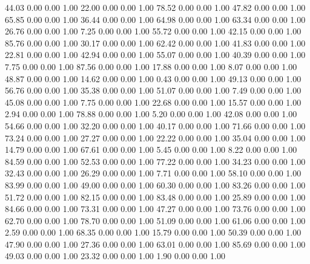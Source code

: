    44.03   0.00   0.00   1.00
   22.00   0.00   0.00   1.00
   78.52   0.00   0.00   1.00
   47.82   0.00   0.00   1.00
   65.85   0.00   0.00   1.00
   36.44   0.00   0.00   1.00
   64.98   0.00   0.00   1.00
   63.34   0.00   0.00   1.00
   26.76   0.00   0.00   1.00
    7.25   0.00   0.00   1.00
   55.72   0.00   0.00   1.00
   42.15   0.00   0.00   1.00
   85.76   0.00   0.00   1.00
   30.17   0.00   0.00   1.00
   62.42   0.00   0.00   1.00
   41.83   0.00   0.00   1.00
   22.81   0.00   0.00   1.00
   42.94   0.00   0.00   1.00
   55.07   0.00   0.00   1.00
   40.39   0.00   0.00   1.00
    7.75   0.00   0.00   1.00
   87.56   0.00   0.00   1.00
   17.88   0.00   0.00   1.00
    8.07   0.00   0.00   1.00
   48.87   0.00   0.00   1.00
   14.62   0.00   0.00   1.00
    0.43   0.00   0.00   1.00
   49.13   0.00   0.00   1.00
   56.76   0.00   0.00   1.00
   35.38   0.00   0.00   1.00
   51.07   0.00   0.00   1.00
    7.49   0.00   0.00   1.00
   45.08   0.00   0.00   1.00
    7.75   0.00   0.00   1.00
   22.68   0.00   0.00   1.00
   15.57   0.00   0.00   1.00
    2.94   0.00   0.00   1.00
   78.88   0.00   0.00   1.00
    5.20   0.00   0.00   1.00
   42.08   0.00   0.00   1.00
   54.66   0.00   0.00   1.00
   32.20   0.00   0.00   1.00
   40.17   0.00   0.00   1.00
   71.66   0.00   0.00   1.00
   73.24   0.00   0.00   1.00
   27.27   0.00   0.00   1.00
   22.22   0.00   0.00   1.00
   35.04   0.00   0.00   1.00
   14.79   0.00   0.00   1.00
   67.61   0.00   0.00   1.00
    5.45   0.00   0.00   1.00
    8.22   0.00   0.00   1.00
   84.59   0.00   0.00   1.00
   52.53   0.00   0.00   1.00
   77.22   0.00   0.00   1.00
   34.23   0.00   0.00   1.00
   32.43   0.00   0.00   1.00
   26.29   0.00   0.00   1.00
    7.71   0.00   0.00   1.00
   58.10   0.00   0.00   1.00
   83.99   0.00   0.00   1.00
   49.00   0.00   0.00   1.00
   60.30   0.00   0.00   1.00
   83.26   0.00   0.00   1.00
   51.72   0.00   0.00   1.00
   82.15   0.00   0.00   1.00
   83.48   0.00   0.00   1.00
   25.89   0.00   0.00   1.00
   84.66   0.00   0.00   1.00
   73.31   0.00   0.00   1.00
   47.27   0.00   0.00   1.00
   73.76   0.00   0.00   1.00
   62.70   0.00   0.00   1.00
   78.70   0.00   0.00   1.00
   51.09   0.00   0.00   1.00
   61.06   0.00   0.00   1.00
    2.59   0.00   0.00   1.00
   68.35   0.00   0.00   1.00
   15.79   0.00   0.00   1.00
   50.39   0.00   0.00   1.00
   47.90   0.00   0.00   1.00
   27.36   0.00   0.00   1.00
   63.01   0.00   0.00   1.00
   85.69   0.00   0.00   1.00
   49.03   0.00   0.00   1.00
   23.32   0.00   0.00   1.00
    1.90   0.00   0.00   1.00
